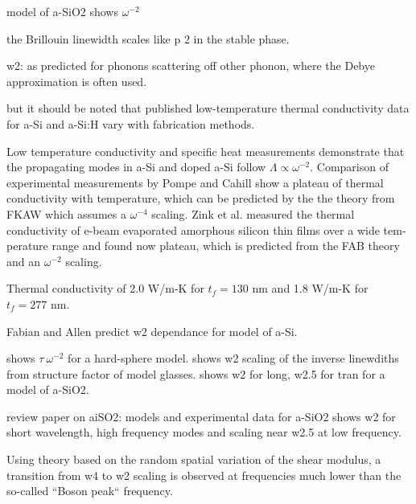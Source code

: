 \documentclass[aps,prb,twocolumn,superscriptaddress,footinbib,amsmath,amssymb,floatfix]{revtex4}
\begin{document}
model of a-SiO2 shows $\omega^{-2}$\cite{taraskin_propagation_2000}

the Brillouin linewidth scales like p 2 in the stable phase.
\cite{ciliberti_brillouin_2003}

w2: as predicted for phonons scattering off other phonon, where 
the Debye approximation is often used. 

but it should be noted that published low-temperature
thermal conductivity data for a-Si and a-Si:H vary with
fabrication methods.
\cite{pompe_thermal_1988,cahill_thermal_1989,cahill_thermal_1994,
zink_thermal_2006} 

Low temperature conductivity and specific heat measurements demonstrate 
that the propagating modes in a-Si and doped a-Si follow 
$\Lambda \propto \omega^{-2}$.
\cite{zink_thermal_2006,zink_excess_2006} 
Comparison of experimental measurements by 
Pompe\cite{pompe_thermal_1988} and Cahill
\cite{cahill_thermal_1989,cahill_thermal_1994} show a plateau of 
thermal conductivity with temperature, 
which can be predicted by the the theory from FKAW which assumes a 
$\omega^{-4}$ scaling.\cite{feldman_thermal_1993}  
Zink et al. measured the thermal conductivity of e-beam
evaporated amorphous silicon thin films over a wide tem-
perature range and found now plateau, which is predicted from the 
FAB theory and an $\omega^{-2}$ scaling.\cite{feldman_numerical_1999}   





Thermal conductivity of 2.0 W/m-K for $t_f = 130$ nm and 1.8 W/m-K 
for $t_f = 277$ nm.\cite{zink_thermal_2006} 



Fabian and Allen predict w2 dependance for model of a-Si.
\cite{fabian_theory_1999}

shows $\tau ~ \omega^{-2}$ for a hard-sphere model.
\cite{gotze_evolution_2000} 
shows w2 scaling of the inverse linewdiths from structure factor of model 
glasses.\cite{shintani_universal_2008}
shows w2 for long, w2.5 for tran for a model of a-SiO2.
\cite{horbach_high_2001}

review paper on aiSO2: models and experimental data for a-SiO2 shows w2 for 
short wavelength, high frequency modes and scaling near w2.5 at low frequency.
\cite{ruocco_high-frequency_2001} 

Using theory based on the random spatial variation of the shear modulus, 
a transition from w4 to w2 scaling is observed at frequencies much lower
than the so-called ``Boson peak`` frequency.
\cite{schirmacher_acoustic_2007}
\end{document}

